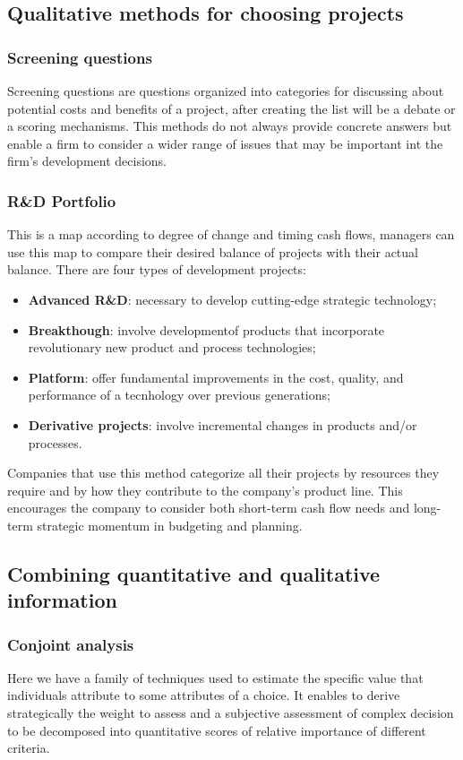 \documentclass[12pt]{article}
\begin{document}
\subsection{Qualitative methods for choosing projects}
\subsubsection{Screening questions}
Screening questions are questions organized into categories for discussing about potential costs and benefits of a project, after creating the list will be a debate or a scoring mechanisms.
This methods do not always provide concrete answers but enable a firm to consider a wider range of issues that may be important int the firm's development decisions.
\subsubsection{R\&D Portfolio}
This is a map according to degree of change and timing cash flows, managers can use this map to compare their desired balance of projects with their actual balance.
There are four types of development projects:
\begin{itemize}
    \item \textbf{Advanced R\&D}: necessary to develop cutting-edge strategic technology;
    \item \textbf{Breakthough}: involve developmentof products that incorporate revolutionary new product and process technologies;
    \item \textbf{Platform}: offer fundamental improvements in the cost, quality, and performance of a tecnhology over previous generations;
    \item \textbf{Derivative projects}: involve incremental changes in products and/or processes. 
\end{itemize}
Companies that use this method categorize all their projects by resources they require and by how they contribute to the company's product line.
This encourages the company to consider both short-term cash flow needs and long-term strategic momentum in budgeting and planning.
\subsection{Combining quantitative and qualitative information}
\subsubsection{Conjoint analysis}
Here we have a family of techniques used to estimate the specific value that individuals attribute to some attributes of a choice.
It enables to derive strategically the weight to assess and a subjective assessment of complex decision to be decomposed into quantitative scores of relative importance of different criteria.
\end{document}
